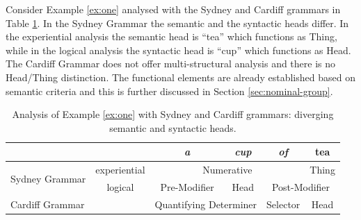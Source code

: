     
    
    Consider Example \ref{ex:one} analysed with the Sydney and Cardiff grammars in Table \ref{tab:the-head-differences}. In the Sydney Grammar the semantic and the syntactic heads differ. In the experiential analysis the semantic head is ``tea'' which functions as Thing, while in the logical analysis the syntactic head is ``cup'' which functions as Head. The Cardiff Grammar does not offer multi-structural analysis and there is no Head/Thing distinction. The functional elements are already established based on semantic criteria and this is further discussed in Section \ref{sec:nominal-group}. 
    
    \begin{table}[!ht]
    	\centering
    	\begin{tabular}{|c|c|c|c|c|c|}
            \hline
            \multicolumn{2}{|c|}{\textit{}}                 & \textit{a}           & \textit{cup}         & \textit{of}         & tea          \\ \hline
            \multirow{2}{*}{Sydney Grammar} & experiential  & \multicolumn{3}{c|}{Numerative}                                   & Thing        \\ \cline{2-6} 
            & logical & Pre-Modifier         & Head                 & \multicolumn{2}{c|}{Post-Modifier} \\ \hline
            \multicolumn{2}{|l|}{Cardiff Grammar}           & \multicolumn{2}{c|}{Quantifying Determiner} & Selector            & Head         \\ \hline
        \end{tabular}
    	\caption{Analysis of Example \ref{ex:one} with Sydney and Cardiff grammars: diverging semantic and syntactic heads.}
    	\label{tab:the-head-differences}
    \end{table}
    
